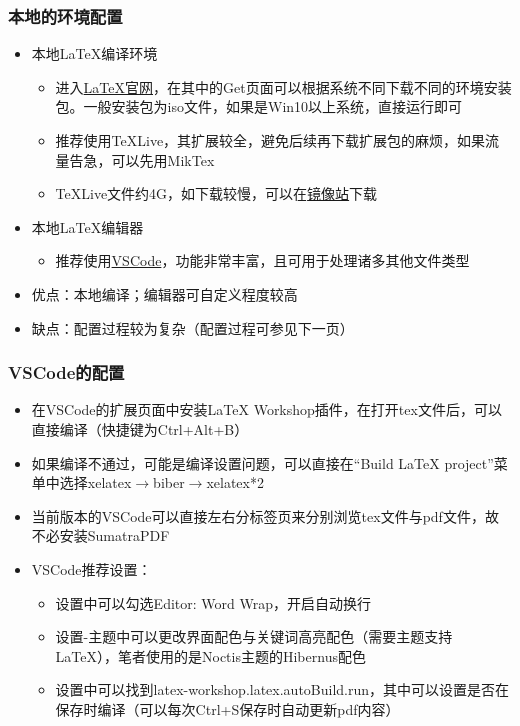 \documentclass{beamer}
\begin{document}
\begin{frame} 
    \frametitle{本地的环境配置} 
    \begin{itemize} 
        \item 本地\LaTeX{}编译环境
        \begin{itemize}
            \item 进入\href{https://www.latex-project.org/}{\LaTeX{}官网}，在其中的Get页面可以根据系统不同下载不同的环境安装包。一般安装包为iso文件，如果是Win10以上系统，直接运行即可
            \item 推荐使用TeXLive，其扩展较全，避免后续再下载扩展包的麻烦，如果流量告急，可以先用MikTex
            \item TeXLive文件约4G，如下载较慢，可以在\href{https://mirrors.tuna.tsinghua.edu.cn/CTAN/systems/texlive/Images/}{镜像站}下载
        \end{itemize}  
        \item 本地\LaTeX{}编辑器
        \begin{itemize}
            \item 推荐使用\href{https://code.visualstudio.com/}{VSCode}，功能非常丰富，且可用于处理诸多其他文件类型
        \end{itemize}
        \item 优点：本地编译；编辑器可自定义程度较高
        \item 缺点：配置过程较为复杂（配置过程可参见下一页）
    \end{itemize} 
\end{frame}

\begin{frame} 
    \frametitle{VSCode的配置} 
    \begin{itemize} 
        \item 在VSCode的扩展页面中安装LaTeX Workshop插件，在打开tex文件后，可以直接编译（快捷键为Ctrl+Alt+B）
        \item 如果编译不通过，可能是编译设置问题，可以直接在“Build LaTeX project”菜单中选择{xelatex$\rightarrow$biber$\rightarrow$xelatex*2}
        \item 当前版本的VSCode可以直接左右分标签页来分别浏览tex文件与pdf文件，故不必安装SumatraPDF
        \item VSCode推荐设置：
        \begin{itemize}
            \item 设置中可以勾选Editor: Word Wrap，开启自动换行
            \item 设置-主题中可以更改界面配色与关键词高亮配色（需要主题支持\LaTeX{}），笔者使用的是Noctis主题的Hibernus配色
            \item 设置中可以找到latex-workshop.latex.autoBuild.run，其中可以设置是否在保存时编译（可以每次Ctrl+S保存时自动更新pdf内容）
        \end{itemize}
    \end{itemize} 
\end{frame}
\end{document}
